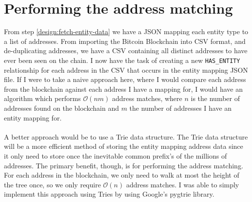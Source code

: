 \section{Performing the address matching}\label{address-matching-trie}
From step \ref{design:fetch-entity-data} we have a JSON mapping each entity type to a list of addresses. From importing the Bitcoin Blockchain into CSV format, and de-duplicating addresses, we have a CSV containing all distinct addresses to have ever been seen on the chain. I now have the task of creating a new \texttt{HAS\_ENTITY} relationship for each address in the CSV that occurs in the entity mapping JSON file. If I were to take a naive approach here, where I would compare each address from the blockchain against each address I have a mapping for, I would have an algorithm which performs $\mathcal{O}(nm)$ address matches, where $n$ is the number of addresses found on the blockchain and $m$ the number of addresses I have an entity mapping for. 
\\\\
A better approach would be to use a Trie data structure. The Trie data structure will be a more efficient method of storing the entity mapping address data since it only need to store once the inevitable common prefix's of the millions of addresses. The primary benefit, though, is for performing the address matching. For each address in the blockchain, we only need to walk at most the height of the tree once, so we only require $\mathcal{O}(n)$ address matches. I was able to simply implement this approach using Tries by using Google's pygtrie library. 